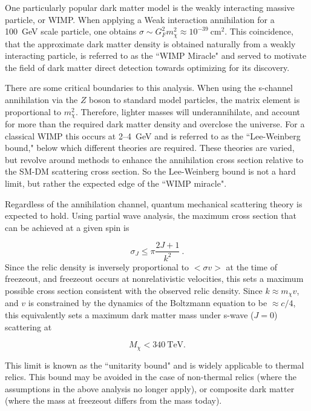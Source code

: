 \noindent
One particularly popular dark matter model is the weakly interacting massive particle, or WIMP.
 When applying a Weak interaction annihilation for a 100~GeV scale particle, one obtains $\sigma \sim G_F^2 m_\chi^2 \approx 10^{-39} \mathrm{~cm}^2$.
 This coincidence, that the approximate dark matter density is obtained naturally from a weakly interacting particle, is referred to as the ``WIMP Miracle" and served to motivate the field of dark matter direct detection towards optimizing for its discovery.
 
 There are some critical boundaries to this analysis. 
 When  using the s-channel annihilation via the $Z$ boson to standard model particles, the matrix element is proportional to  $m_\chi^2$.
 Therefore, lighter masses will underannihilate, and account for more than the required dark matter density and overclose the universe.
 For a classical WIMP this occurs at 2--4~GeV and is referred to as the ``Lee-Weinberg bound," below which different theories are required.
 These theories are varied, but revolve around methods to enhance the annihilation cross section relative to the SM-DM scattering cross section.
 So the Lee-Weinberg bound is not a hard limit, but rather the expected edge of the ``WIMP miracle".
 
 Regardless of the annihilation channel, quantum mechanical scattering theory is expected to hold.
Using partial wave analysis, the maximum cross section that can be achieved at a given spin is

\begin{equation}
    \sigma_J \leq \pi \frac{2J+1}{k^2}~.
    \label{eq:partialwaves}
\end{equation}
\noindent
Since the relic density is inversely proportional to $<\sigma v>$ at the time of freezeout, and freezeout occurs at nonrelativistic velocities, this sets a maximum possible cross section consistent with the observed relic density.
Since $k \approx m_\chi v $, and $v$ is constrained by the dynamics of the Boltzmann equation to be $\approx c/4$, this equivalently sets a maximum dark matter mass under s-wave ($J=0$) scattering at\cite{griest_unitarity_1990}

\begin{equation}
    M_\chi < 340 \mathrm{~TeV} .
\end{equation}

\noindent
This limit is known as the ``unitarity bound" and is widely applicable to thermal relics. 
This bound may be avoided in the case of non-thermal relics (where the assumptions in the above analysis no longer apply), or composite dark matter (where the mass at freezeout differs from the mass today).


